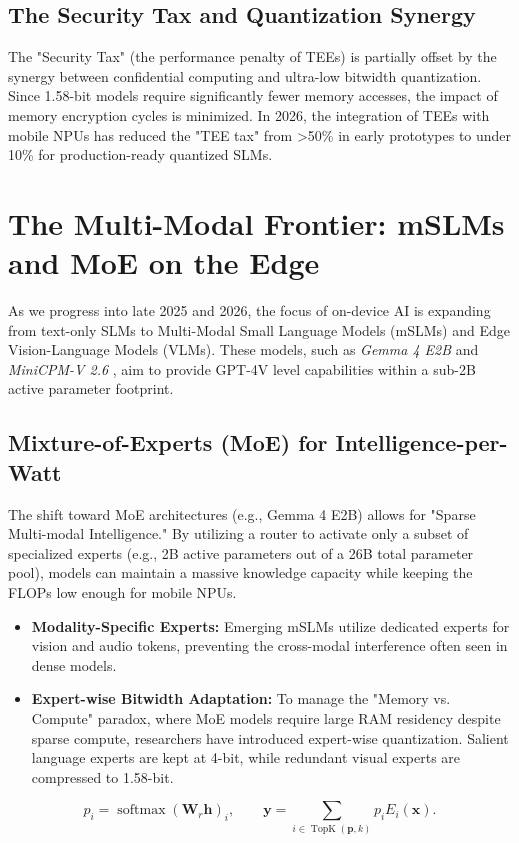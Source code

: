 \documentclass[twocolumn,10pt]{article}
\begin{document}
\subsection{The Security Tax and Quantization Synergy}
The "Security Tax" (the performance penalty of TEEs) is partially offset by the synergy between confidential computing and ultra-low bitwidth quantization. Since 1.58-bit models require significantly fewer memory accesses, the impact of memory encryption cycles is minimized. In 2026, the integration of TEEs with mobile NPUs has reduced the "TEE tax" from >50\% in early prototypes to under 10\% for production-ready quantized SLMs.

\section{The Multi-Modal Frontier: mSLMs and MoE on the Edge}
As we progress into late 2025 and 2026, the focus of on-device AI is expanding from text-only SLMs to Multi-Modal Small Language Models (mSLMs) and Edge Vision-Language Models (VLMs). These models, such as \textit{Gemma 4 E2B} \cite{gemma4_2026} and \textit{MiniCPM-V 2.6} \cite{minicpm_v_2025}, aim to provide GPT-4V level capabilities within a sub-2B active parameter footprint.

\subsection{Mixture-of-Experts (MoE) for Intelligence-per-Watt}
The shift toward MoE architectures (e.g., Gemma 4 E2B) allows for "Sparse Multi-modal Intelligence." By utilizing a router to activate only a subset of specialized experts (e.g., 2B active parameters out of a 26B total parameter pool), models can maintain a massive knowledge capacity while keeping the FLOPs low enough for mobile NPUs. 
\begin{itemize}
    \item \textbf{Modality-Specific Experts:} Emerging mSLMs utilize dedicated experts for vision and audio tokens, preventing the cross-modal interference often seen in dense models.
    \item \textbf{Expert-wise Bitwidth Adaptation:} To manage the "Memory vs. Compute" paradox, where MoE models require large RAM residency despite sparse compute, researchers have introduced expert-wise quantization. Salient language experts are kept at 4-bit, while redundant visual experts are compressed to 1.58-bit.
\end{itemize}
\begin{equation}
p_i=\operatorname{softmax}(\mathbf{W}_r\mathbf{h})_i,\qquad
\mathbf{y}=\sum_{i\in\operatorname{TopK}(\mathbf{p},k)}p_i E_i(\mathbf{x}).
\label{eq:moe_router}
\end{equation}
\end{document}
